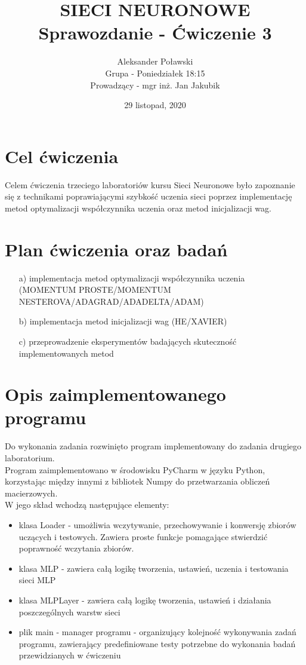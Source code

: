 \documentclass[17pt]{article}
\title{\textbf{SIECI NEURONOWE\\Sprawozdanie - Ćwiczenie 3}}
\author{Aleksander Poławski\\Grupa - Poniedziałek 18:15\\Prowadzący - mgr inż. Jan Jakubik}
\date{29 listopad, 2020}
\begin{document}
\maketitle	

\section{Cel ćwiczenia}
Celem ćwiczenia trzeciego laboratoriów kursu Sieci Neuronowe było zapoznanie się z technikami poprawiającymi szybkość uczenia sieci poprzez implementację metod optymalizacji współczynnika uczenia oraz metod inicjalizacji wag.

\section{Plan ćwiczenia oraz badań}

\begin{enumerate}
\item[a)] implementacja metod optymalizacji współczynnika uczenia\\ (MOMENTUM PROSTE/MOMENTUM NESTEROVA/ADAGRAD/ADADELTA/ADAM)

\item[b)] implementacja metod inicjalizacji wag (HE/XAVIER)

\item[c)] przeprowadzenie eksperymentów badających skuteczność implementowanych metod

\end{enumerate}

\section{Opis zaimplementowanego programu}

Do wykonania zadania rozwinięto program implementowany do zadania drugiego laboratorium.\\

Program zaimplementowano w środowisku PyCharm w języku Python, korzystając między innymi z bibliotek Numpy do przetwarzania obliczeń macierzowych.\\

W jego skład wchodzą następujące elementy:
\begin{itemize}
\item klasa Loader - umożliwia wczytywanie, przechowywanie i konwersję zbiorów uczących i testowych. Zawiera proste funkcje pomagające stwierdzić poprawność wczytania zbiorów.
\item klasa MLP - zawiera całą logikę tworzenia, ustawień, uczenia i testowania sieci MLP
\item klasa MLPLayer - zawiera całą logikę tworzenia, ustawień i działania poszczególnych warstw sieci
\item plik main - manager programu - organizujący kolejność wykonywania zadań programu, zawierający predefiniowane testy potrzebne do wykonania badań przewidzianych w ćwiczeniu
\end{itemize}
\end{document}
